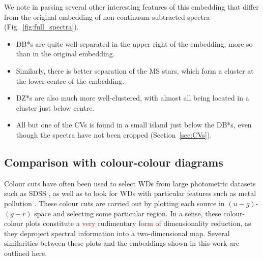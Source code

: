 \documentclass[fleqn,usenatbib]{mnras}
\newcommand{\red}[1]{\textcolor{red}{#1}}
\begin{document}
We note in passing several other interesting features of this embedding that differ from the original embedding of non-continuum-subtracted spectra (Fig.~\ref{fig:full_spectra}).
\begin{itemize}
\item
DB*s are quite well-separated in the upper right of the embedding, more so than in the original embedding.
\item
Similarly, there is better separation of the MS stars, which form a cluster at the lower centre of the embedding.
\item
DZ*s are also much more well-clustered, with almost all being located in a cluster just below centre.
\item
All but one of the CVs is found in a small island just below the DB*s, even though the spectra have not been cropped (Section~\ref{sec:CVs}).
\end{itemize}

\subsection{Comparison with colour-colour diagrams}
\label{sec:colourcolour}

Colour cuts have often been used to select WDs from large photometric datasets such as SDSS \citep{eisenstein06, gentilefusillo15}, as well as to look for WDs with particular features such as metal pollution \citep{hollands15}.
These colour cuts are carried out by plotting each source in $(u-g)$-$(g-r)$ space and selecting some particular region.
In a sense, these colour-colour plots constitute \red{a very} rudimentary \red{form of} dimensionality reduction, as they deproject spectral information into a two-dimensional map.
Several similarities between these plots and the embeddings shown in this work are outlined here.
\end{document}
